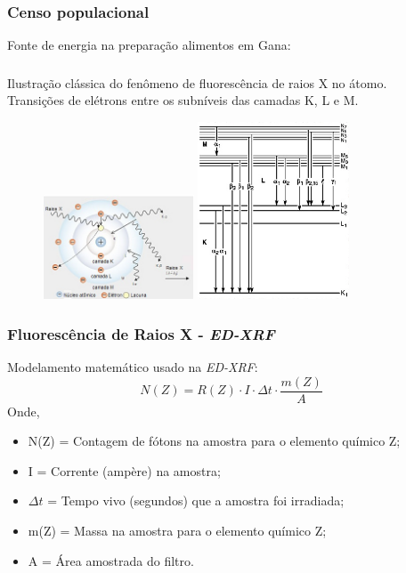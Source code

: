 \begin{frame}
  \frametitle{Censo populacional}
\begin{center}
  Fonte de energia na preparação alimentos em Gana:
\end{center}
  \begin{table}[H]
  	\centering
  	
  \end{table}
\end{frame}

\begin{frame}
  \frametitle{}
  Ilustração clássica do fenômeno de fluorescência de raios X no átomo.\\
  Transições de elétrons entre os subníveis das camadas K, L e M. 
  \begin{figure}[H]
    \centering
    \includegraphics[width=0.4\textwidth]{../../inputs/images/shimadzu_atomo.jpg}
    \hspace{1cm}
    \includegraphics[width=0.4\textwidth]{../../inputs/images/Siegbahn.jpg}
  \end{figure}
\end{frame}

\begin{frame}
  \frametitle{Fluorescência de Raios X - \textit{ED-XRF}}
  Modelamento matemático usado na \textit{ED-XRF}:
  \begin{equation*}
    \label{eq:contagem}
    N(Z) = R(Z) \cdot I \cdot \Delta t  \cdot \frac{m(Z)}{A}
  \end{equation*}
  Onde,  
  \begin{itemize}
    \item N(Z) = Contagem de fótons na amostra para o elemento químico Z;
    \item I = Corrente (ampère) na amostra;
    \item $\Delta t$ = Tempo vivo (segundos) que a amostra foi irradiada;
    \item m(Z) = Massa na amostra para o elemento químico Z;
    \item A = Área amostrada do filtro.
  \end{itemize}
\end{frame}

